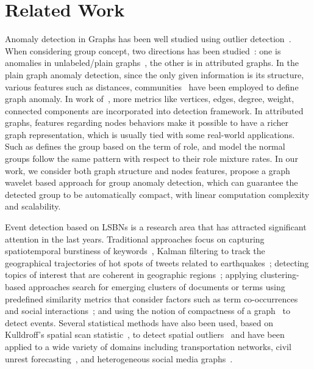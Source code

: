\section{Related Work} \label{sec:related}

Anomaly detection in Graphs has been well studied using outlier detection~\cite{akoglu2009anomaly}. When considering group concept, two directions has been studied~\cite{akoglu2015graph}: one is anomalies in unlabeled/plain graphs~\cite{noble2003graph}, the other is in attributed graphs. In the plain graph anomaly detection, since the only given information is its structure, various features such as distances, communities~\cite{sun2005neighborhood} have been employed to define graph anomaly. In work of~\cite{henderson2010metric}, more metrics like vertices, edges, degree, weight, connected components are incorporated into detection framework. In attributed graphs, features regarding nodes behaviors make it possible to have a richer graph representation, which is usually tied with some real-world applications. Such as \cite{yu2014glad} defines the group based on the term of role, and model the normal groups follow the same pattern with respect to their role mixture rates. In our work, we consider both graph structure and nodes features, propose a graph wavelet based approach for group anomaly detection, which can guarantee the detected group to be automatically compact, with linear computation complexity and scalability.

Event detection based on LSBNs is a research area that has attracted significant attention in the last years. Traditional approaches focus on capturing spatiotemporal burstiness of keywords~\cite{lappas2009burstiness,lappas2012spatiotemporal}, Kalman filtering to track the geographical trajectories of hot spots of tweets related to earthquakes~\cite{sakaki2010earthquake}; detecting topics of interest that are coherent in geographic regions~\cite{eisenstein2010latent,hong2012discovering,yin2011geographical}; applying clustering-based approaches search for emerging clusters of documents or terms using predefined similarity metrics that consider factors such as term co-occurrences and social interactions~\cite{aggarwal2012event,sayyadi2009event,watanabe2011jasmine,weng2011event}; and using the notion of compactness of a graph~\cite{rozenshtein2014event} to detect events. Several statistical methods have also been used, based on Kulldroff’s spatial scan statistic~\cite{kulldorff1997spatial}, to detect spatial outliers~\cite{chen2008detecting} and have been applied to a wide variety of domains including transportation networks, civil unrest forecasting~\cite{zhao2014unsupervised}, and heterogeneous social media graphs~\cite{chen2014non}.

